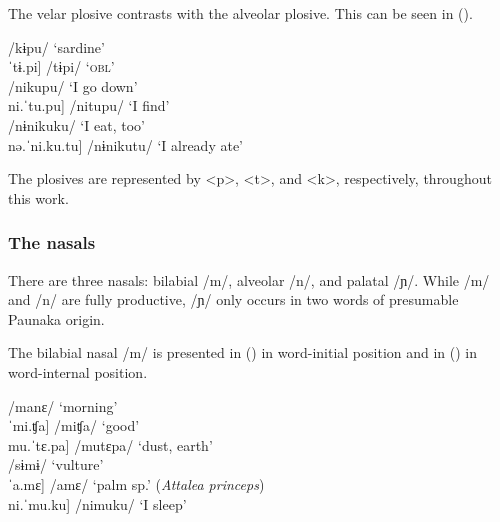 The velar plosive contrasts with the alveolar plosive. This can be seen in ().

\ea\label{ex:k-t}
\ea      \tab[ˈkɨ.pu] \tab\tab /kɨpu/ \tab ‘sardine’\\
     \tab{[}ˈtɨ.pi] \tab\tab /tɨpi/ \tab\tab ‘\textsc{obl}’\\
\ex  \tab[ni.ˈku.pu] \tab\tab /nikupu/ \tab ‘I go down’\\
     \tab{[}ni.ˈtu.pu] \tab\tab /nitupu/ \tab ‘I find’\\
\ex  \tab[nə.ˈni.ku.ku] \tab /nɨnikuku/ \tab ‘I eat, too’\\
    \tab{[}nə.ˈni.ku.tu] \tab /nɨnikutu/ \tab ‘I already ate’\\%
\z
\xe
    

The plosives are represented by <p>, <t>, and <k>, respectively, throughout this work.


\subsubsection{The nasals} \label{Nasals}
There are three nasals: bilabial /m/, alveolar /n/, and palatal /ɲ/. While /m/ and /n/ are fully productive, /ɲ/ only occurs in two words of presumable Paunaka origin.

The bilabial nasal /m/ is presented in () in word-initial position and in () in word-internal position.
 
\ea\label{ex:m}
\ea\label{ex:m.1}    \tab[ˈma.nɛ] \tab  /manɛ/ \tab  ‘morning’\\
     \tab{[}ˈmi.ʧa] \tab /miʧa/ \tab ‘good’\\
     \tab{[}mu.ˈtɛ.pa] \tab /mutɛpa/ \tab ‘dust, earth’\\
\ex\label{ex:m.2}   \tab[ˈsɨ.mɨ] \tab  /sɨmɨ/ \tab  ‘vulture’\\
      \tab{[}ˈa.mɛ] \tab /amɛ/ \tab\tab ‘palm sp.’ (\textit{Attalea princeps})\\  %
     \tab{[}ni.ˈmu.ku] \tab /nimuku/ \tab ‘I sleep’\\%
\z
\xe 
 
